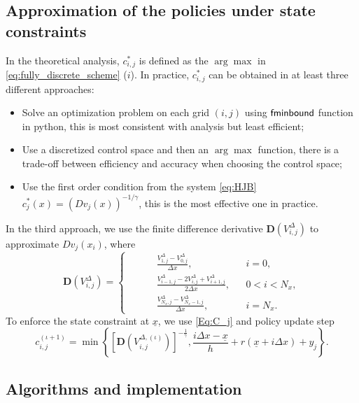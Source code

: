 \documentclass[11pt]{article}
\numberwithin{equation}{section}
\theoremstyle{Claim}
\def\i{{(\iota)}}
\def\bV{{\mathbf{V}}}
\newcommand{\ux}{{\underline x}}
\newcommand{\beq}{\begin{equation}}
\newcommand{\eeq}{\end{equation}}
\theoremstyle{plain}
\newcommand{\D}{\Delta}
\begin{document}
\subsection{Approximation of the policies under state constraints}
In the theoretical analysis, $c^*_{i,j}$ is defined as the $\arg\max$ in \cref{eq:fully_discrete_scheme} ($i$). In practice, $c^*_{i,j}$ can be obtained in at least three different approaches:
\begin{itemize}
\item Solve an optimization problem on each grid $(i,j)$ using $\sf{fminbound}$ function in python, this is most consistent with analysis but least efficient;
\item Use a discretized control space and then an $\arg\max$ function, there is a trade-off between efficiency and accuracy when choosing the control space;
\item Use the first order condition from the system \eqref{eq:HJB} $c_j^*(x)=(Dv_j(x))^{-1/\gamma}$, this is the most effective one in practice.
\end{itemize}
In the third approach, we use the finite difference derivative ${\mathbf{D}}(V_{i,j}^{\Delta})$ to approximate $Dv_j(x_i)$, where
\beq
{\mathbf{D}}(V_{i,j}^{\Delta})=
\left\{\begin{aligned}
\qquad &\frac{V_{1,j}^{\Delta}-V_{0,j}^{\Delta}}{\D x},\qquad &&i=0,\\
&\frac{V_{i-1,j}^{\Delta}-2V_{i,j}^{\Delta}+V_{i+1,j}^{\Delta}}{2\D x},&&0<i<N_x,\\
&\frac{V_{N_x,j}^{\Delta}-V_{N_x-1,j}^{\Delta}}{\D x},&&i=N_x.
\end{aligned}\right.
\eeq
To enforce the state constraint at $\ux$, we use \cref{Eq:C_j} and policy update step
\beq\label{approx pi}
c^{(\iota+1)}_{i,j} = \min \left\{\left[{\mathbf{D}}(V_{i,j}^{\Delta,\i})\right]^{-\tfrac{1}{\gamma}},\frac{i\D x-\ux}{h}+r(\ux+i\D x)+y_j\right\}.
\eeq

\subsection{Algorithms and implementation}
\end{document}
